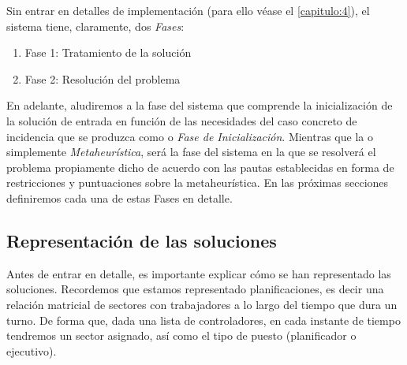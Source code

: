
Sin entrar en detalles de implementación (para ello véase el \autoref{capitulo:4}), el sistema tiene, claramente, dos 
\textit{Fases}:
\begin{enumerate}[label={}]
	\item \label{Fase 1} Fase 1: Tratamiento de la solución
	\item \label{Fase 2} Fase 2: Resolución del problema
\end{enumerate}

En adelante, aludiremos a la fase del sistema que comprende la inicialización de la solución de entrada en función de las necesidades del caso concreto de incidencia que se produzca como \faseuno{} o \textit{Fase de Inicialización}. 
Mientras que la \fasedos{} o simplemente \textit{Metaheurística}, será la fase del sistema en la que se resolverá el problema propiamente dicho de acuerdo con las pautas establecidas en forma de restricciones y puntuaciones sobre la metaheurística.
En las próximas secciones definiremos cada una de estas Fases en detalle.

\subsection{Representación de las soluciones}
\label{sec:3:representacion-soluciones}

Antes de entrar en detalle, es importante explicar cómo se han representado las soluciones. Recordemos que estamos representado planificaciones, es decir una relación matricial de sectores con trabajadores a lo largo del tiempo que dura un turno. De forma que, dada una lista de controladores, en cada instante de tiempo tendremos un sector asignado, así como el tipo de puesto (planificador o ejecutivo).

